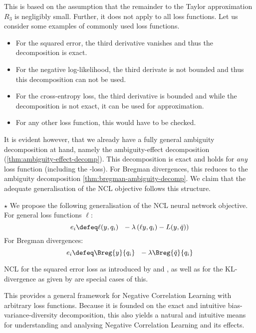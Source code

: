 \documentclass[../main.tex]{subfiles}
\begin{document}
This is based on the assumption that the remainder to the Taylor approximation $R_{3}$ is negligibly small. Further, it does not apply to all loss functions. Let us consider some examples of commonly used loss functions.
\begin{itemize}
\item For the squared error, the third derivative vanishes and thus the decomposition is exact.
\item For the negative log-likelihood,
the third derivate is not bounded and thus this decomposition can not be used.
\item For the cross-entropy loss, 
the third derivative is bounded and while the decomposition is not exact, it can be used for approximation. %
\item For any other loss function, this would have to be checked.
\end{itemize}

It is evident however, {that we already have a fully general ambiguity decomposition at hand}, namely the ambiguity-effect decomposition (\ref{thm:ambiguity-effect-decomp}). 
This decomposition is exact and holds for \textit{any} loss function (including the \zeroone-loss). 
For Bregman divergences, this reduces to the ambiguity decomposition \ref{thm:bregman-ambiguity-decomp}.
%
We claim that the adequate generalisation of the NCL objective follows this structure.
\begin{proposition} $\star$ We propose the following generalisation of the NCL neural network objective. For general loss functions $\ell$:
$$
e_{i} \defeq \ell(y, q_{i}) ~ ~ - \lambda \left( 
 \ell y, q_{i}) - L(y, \bar{q})
\right)
$$
For Bregman divergences:
$$
e_{i} \defeq \Breg{y}{q_{i}} ~ ~ - \lambda  \Breg{\bar{q}}{q_{i}}
$$
\end{proposition}
NCL for the squared error loss as introduced by \cite{liu_EnsembleLearningNegative_1999} and \cite{brown_ManagingDiversityRegression_2005}, as well as for the KL-divergence as given by \cite{webb_EnsembleNotEnsemble_2019} are special cases of this.

This provides a general framework for Negative Correlation Learning with arbitrary loss functions. Because it is founded on the exact and intuitive bias-variance-diversity decomposition, this also yields a natural and intuitive means for understanding and analysing Negative Correlation Learning and its effects.
\end{document}
